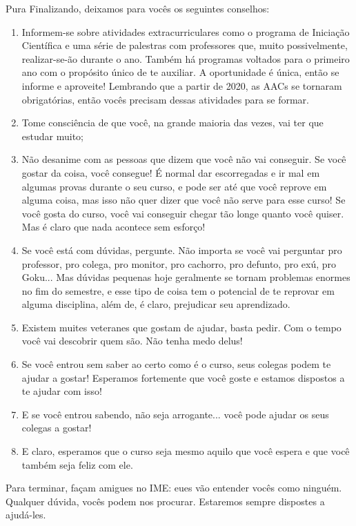 \begin{subsecao}{Pura}
Finalizando, deixamos para vocês os seguintes conselhos:
\begin{enumerate}
\item Informem-se sobre atividades extracurriculares como o programa de
Iniciação Científica e uma série de palestras com professores que, muito possivelmente,
realizar-se-ão durante o ano. Também há programas voltados para o primeiro ano
com o propósito único de te auxiliar. A oportunidade é única, então se informe e aproveite!
Lembrando que a partir de 2020, as AACs se tornaram obrigatórias, então vocês precisam
dessas atividades para se formar.
\item Tome consciência de que você, na grande maioria das vezes, vai ter que
estudar muito;
\item Não desanime com as pessoas que dizem que você não vai conseguir. Se
você gostar da coisa, você consegue! É normal dar escorregadas e ir mal em algumas
provas durante o seu curso, e pode ser até que você reprove em alguma coisa,
mas isso não quer dizer que você não serve para esse curso! Se você gosta do curso,
você vai conseguir chegar tão longe quanto você quiser. Mas é claro que nada
acontece sem esforço!
\item Se você está com dúvidas, pergunte. Não importa se você vai perguntar
pro professor, pro colega, pro monitor, pro cachorro, pro defunto, pro exú, pro
Goku... Mas dúvidas pequenas hoje geralmente se tornam problemas enormes
no fim do semestre, e esse tipo de coisa tem o potencial de te reprovar em alguma
disciplina, além de, é claro, prejudicar seu aprendizado.
\item Existem muites veteranes que gostam de ajudar, basta pedir. Com o tempo 
você vai descobrir quem são. Não tenha medo delus!
\item Se você entrou sem saber ao certo como é o curso, seus colegas podem
te ajudar a gostar! Esperamos fortemente que você goste e estamos dispostos a te ajudar com isso!
\item E se você entrou sabendo, não seja arrogante... você pode ajudar os seus
colegas a gostar!
\item E claro, esperamos que o curso seja mesmo aquilo que você
espera e que você também seja feliz com ele.

\end{enumerate}
Para terminar, façam amigues no IME: eues vão entender vocês como ninguém. Qualquer dúvida,
vocês podem nos procurar. Estaremos sempre dispostes a ajudá-les.

\end{subsecao}
